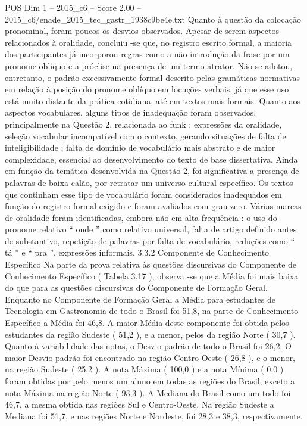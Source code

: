 \begin{textsample}{POS Dim 1 – 2015\_c6 – Score 2.00 – 2015\_c6/enade\_2015\_tec\_gastr\_1938c9be4e.txt}
Quanto à questão da colocação pronominal, foram poucos os desvios observados.
Apesar de serem aspectos relacionados à oralidade, concluiu -se que, no registro escrito formal, a maioria dos participantes já incorporou regras como a não introdução da frase por um pronome oblíquo e a próclise na presença de um termo atrator.
Não se adotou, entretanto, o padrão excessivamente formal descrito pelas gramáticas normativas em relação à posição do pronome oblíquo em locuções verbais, já que esse uso está muito distante da prática cotidiana, até em textos mais formais.
Quanto aos aspectos vocabulares, alguns tipos de inadequação foram observados, principalmente na Questão 2, relacionada ao funk : expressões da oralidade, seleção vocabular incompatível com o contexto, gerando situações de falta de inteligibilidade ; falta de domínio de vocabulário mais abstrato e de maior complexidade, essencial ao desenvolvimento do texto de base dissertativa.
Ainda em função da temática desenvolvida na Questão 2, foi significativa a presença de palavras de baixa calão, por retratar um universo cultural específico.
Os textos que continham esse tipo de vocabulário foram considerados inadequados em função do registro formal exigido e foram avaliados com grau zero.
Várias marcas de oralidade foram identificadas, embora não em alta frequência : o uso do pronome relativo “ onde ” como relativo universal, falta de artigo definido antes de substantivo, repetição de palavras por falta de vocabulário, reduções como “ tá ” e “ pra ”, expressões informais. 3.3.2 Componente de Conhecimento Específico Na parte da prova relativa às questões discursivas do Componente de Conhecimento Específico ( Tabela 3.17 ), observa -se que a Média foi mais baixa do que para as questões discursivas do Componente de Formação Geral.
Enquanto no Componente de Formação Geral a Média para estudantes de Tecnologia em Gastronomia de todo o Brasil foi 51,8, na parte de Conhecimento Específico a Média foi 46,8.
A maior Média deste componente foi obtida pelos estudantes da região Sudeste ( 51,2 ), e a menor, pelos da região Norte ( 30,7 ).
Quanto à variabilidade das notas, o Desvio padrão de todo o Brasil foi 26,2.
O maior Desvio padrão foi encontrado na região Centro-Oeste ( 26,8 ), e o menor, na região Sudeste ( 25,2 ).
A nota Máxima ( 100,0 ) e a nota Mínima ( 0,0 ) foram obtidas por pelo menos um aluno em todas as regiões do Brasil, exceto a nota Máxima na região Norte ( 93,3 ).
A Mediana do Brasil como um todo foi 46,7, a mesma obtida nas regiões Sul e Centro-Oeste.
Na região Sudeste a Mediana foi 51,7, e nas regiões Norte e Nordeste, foi 28,3 e 38,3, respectivamente.

\end{textsample}
